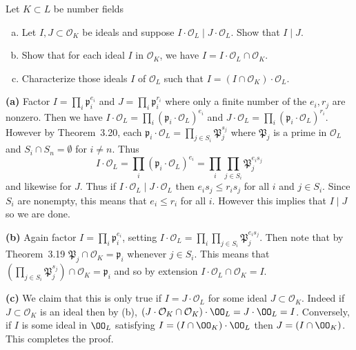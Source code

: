 \documentclass[11pt,letterpaper]{article}
\begin{document}
\begin{cproblem}{3.9}
    Let $K\subset L$ be number fields
    \begin{enumerate}[(a)]
        \item Let $I,J\subset \mathcal{O}_K$ be ideals and suppose $I\cdot\mathcal{O}_L \mid J\cdot\mathcal{O}_L$. Show that $I \mid J$.
        \item Show that for each ideal $I$ in $\mathcal{O}_K$, we have $I=I\cdot\mathcal{O}_L\cap \mathcal{O}_K$.
        \item Characterize those ideals $I$ of $\mathcal{O}_L$ such that $I=(I\cap \mathcal{O}_K)\cdot\mathcal{O}_L$.   
    \end{enumerate}
\end{cproblem}

\begin{solution}
    \textbf{(a)} Factor $I=\prod_i\mathfrak{p}^{e_i}_i$ and $J=\prod_i\mathfrak{p}^{r_i}_i$ where only a finite number of the $e_i, r_j$ are nonzero. Then we have $I\cdot \mathcal{O}_L=\prod_i\left(\mathfrak{p}_i\cdot \mathcal{O}_L\right)^{e_i}$ and $J\cdot \mathcal{O}_L=\prod_i \left(\mathfrak{p}_i\cdot \mathcal{O}_L \right)^{r_i}$. However by Theorem~3.20, each $\mathfrak{p}_i\cdot \mathcal{O}_L=\prod_{j\in S_i}\mathfrak{P}_j^{s_j}$ where $\mathfrak{P}_j$ is a prime in $\mathcal{O}_L$ and $S_i\cap S_n=\emptyset$ for $i\neq n$. Thus 
    \[
        I\cdot \mathcal{O}_L=\prod_i\left(\mathfrak{p}_i\cdot \mathcal{O}_L\right)^{e_i}=\prod_i \prod_{j\in S_i}\mathfrak{P}_j^{e_is_j}
    \]  
    and likewise for $J$. Thus if $I\cdot \mathcal{O}_L \mid J\cdot \mathcal{O}_L$ then $e_is_j\leq r_is_j$ for all $i$ and $j\in S_i$. Since $S_i$ are nonempty, this means that $e_i\leq r_i$ for all $i$. However this implies that $I\mid J$ so we are done.
    
    \textbf{(b)} Again factor $I=\prod_i\mathfrak{p}^{e_i}_i$, setting $I\cdot \mathcal{O}_L=\prod_i\prod_{j\in S_i}\mathfrak{P}^{e_is_j}_j$. Then note that by Theorem~3.19 $\mathfrak{P}_j\cap \mathcal{O}_K=\mathfrak{p}_i$ whenever $j\in S_i$. This means that $\left(\prod_{j\in S_i}\mathfrak{P}^{s_j}_j\right)\cap \mathcal{O}_K=\mathfrak{p}_i$ and so by extension $I\cdot \mathcal{O}_L\cap \mathcal{O}_K=I$.    
    
    \textbf{(c)} We claim that this is only true if $I=J\cdot \mathcal{O}_L$ for some ideal $J\subset\mathcal{O}_K$. Indeed if $J\subset \mathcal{O}_K$ is an ideal then by (b), $(J\cdot \mathcal{O}_K\cap \mathcal{O}_K)\cdot \OO_L=J\cdot \OO_L=I$. Conversely, if $I$ is some ideal in $\OO_L$ satisfying $I=(I\cap \OO_K )\cdot \OO_L$ then $J=(I\cap \OO_K)$. This completes the proof.  
\end{solution}
\end{document}
